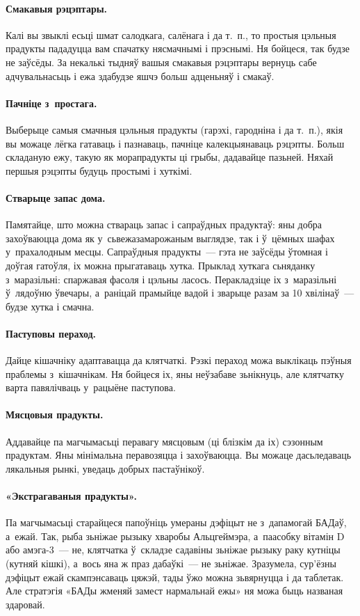 \paragraph{Смакавыя рэцэптары.}
Калі вы звыклі есьці шмат салодкага, салёнага і да т.~п., то простыя цэльныя прадукты пададуцца вам спачатку нясмачнымі і прэснымі. Ня бойцеся, так будзе не заўсёды. За некалькі тыдняў вашыя смакавыя рэцэптары вернуць сабе адчувальнасьць і ежа здабудзе яшчэ больш адценьняў і смакаў.

\paragraph{Пачніце з~простага.}
Выберыце самыя смачныя цэльныя прадукты (гарэхі, гародніна і да т.~п.), якія вы можаце лёгка гатаваць і пазнаваць, пачніце калекцыянаваць рэцэпты. Больш складаную ежу, такую як морапрадукты ці грыбы, дадавайце пазьней. Няхай першыя рэцэпты будуць простымі і хуткімі.

\paragraph{Стварыце запас дома.}
Памятайце, што можна ствараць запас і сапраўдных прадуктаў: яны добра захоўваюцца дома як у~сьвежазамарожаным выглядзе, так і ў~цёмных шафах у~прахалодным месцы. Сапраўдныя прадукты~--- гэта не заўсёды ўтомная і доўгая гатоўля, іх можна прыгатаваць хутка. Прыклад хуткага сьняданку з~маразільні: спаржавая фасоля і цэльны ласось. Перакладзіце іх з~маразільні ў~лядоўню ўвечары, а~раніцай прамыйце вадой і зварыце разам за 10 хвілінаў~--- будзе хутка і смачна.

\paragraph{Паступовы пераход.}
Дайце кішачніку адаптавацца да клятчаткі. Рэзкі пераход можа выклікаць пэўныя праблемы з~кішачнікам. Ня бойцеся іх, яны неўзабаве зьнікнуць, але клятчатку варта павялічваць у~рацыёне паступова.

\paragraph{Мясцовыя прадукты.}
Аддавайце па магчымасьці перавагу мясцовым (ці блізкім да іх) сэзонным прадуктам. Яны мінімальна перавозяцца і захоўваюцца. Вы можаце дасьледаваць лякальныя рынкі, уведаць добрых пастаўнікоў.

\paragraph{«Экстрагаваныя прадукты».}
Па магчымасьці старайцеся папоўніць умераны дэфіцыт не з~дапамогай БАДаў, а~ежай. Так, рыба зьніжае рызыку хваробы Альцгеймэра, а~паасобку вітамін D або амэга-3~--- не, клятчатка ў~складзе садавіны зьніжае рызыку раку кутніцы (кутняй кішкі), а~вось яна ж праз дабаўкі~--- не зьніжае. Зразумела, сур'ёзны дэфіцыт ежай скампэнсаваць цяжэй, тады ўжо можна зьвярнуцца і да таблетак. Але стратэгія «БАДы жменяй замест нармальнай ежы» ня можа быць названая здаровай.

